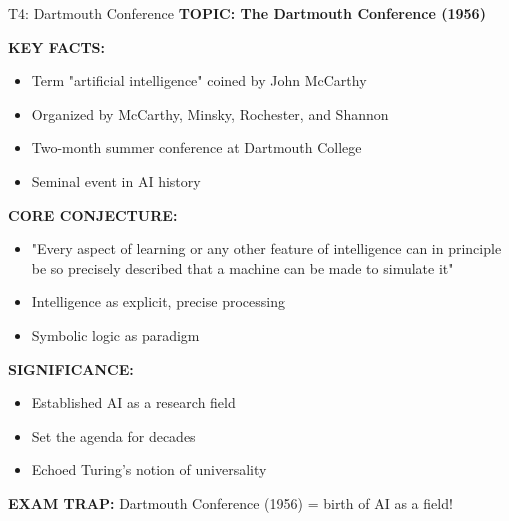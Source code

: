 \documentclass[8pt]{beamer}
\begin{document}
	\begin{frame}{T4: Dartmouth Conference}
		\fontsize{6.5}{7.5}\selectfont
		\textbf{TOPIC: The Dartmouth Conference (1956)}
		
		\vspace{0.1cm}
		\textbf{KEY FACTS:}
		\begin{itemize}
			\item Term "artificial intelligence" coined by John McCarthy
			\item Organized by McCarthy, Minsky, Rochester, and Shannon
			\item Two-month summer conference at Dartmouth College
			\item Seminal event in AI history
		\end{itemize}
		
		\vspace{0.1cm}
		\textbf{CORE CONJECTURE:}
		\begin{itemize}
			\item "Every aspect of learning or any other feature of intelligence can in principle be so precisely described that a machine can be made to simulate it"
			\item Intelligence as explicit, precise processing
			\item Symbolic logic as paradigm
		\end{itemize}
		
		\vspace{0.1cm}
		\textbf{SIGNIFICANCE:}
		\begin{itemize}
			\item Established AI as a research field
			\item Set the agenda for decades
			\item Echoed Turing's notion of universality
		\end{itemize}
		
		\textcolor{myred}{\textbf{EXAM TRAP:}} Dartmouth Conference (1956) = \textcolor{myblue}{birth of AI as a field}!
	\end{frame}
	
\end{document}
